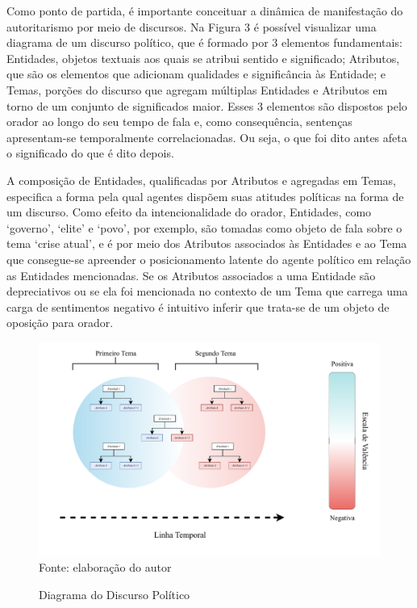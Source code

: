 \documentclass[
12pt,				%
openright,			%
twoside,			%
a4paper,			%
english,			%
french,				%
spanish,			%
brazil				%
]{abntex2}
\begin{document}
Como ponto de partida, é importante conceituar a dinâmica de manifestação do autoritarismo por meio de discursos. Na Figura 3 é possível visualizar uma diagrama de um discurso político, que é formado por 3 elementos fundamentais: Entidades, objetos textuais aos quais se atribui sentido e significado; Atributos, que são os elementos que adicionam qualidades e significância às Entidade; e Temas, porções do discurso que agregam múltiplas Entidades e Atributos em torno de um conjunto de significados maior. Esses 3 elementos são dispostos pelo orador ao longo do seu tempo de fala e, como consequência, sentenças apresentam-se temporalmente correlacionadas. Ou seja, o que foi dito antes afeta o significado do que é dito depois.

A composição de Entidades, qualificadas por Atributos e agregadas em Temas, especifica a forma pela qual agentes dispõem suas atitudes políticas na forma de um discurso. Como efeito da intencionalidade do orador, Entidades, como `governo', `elite' e `povo', por exemplo, são tomadas como objeto de fala sobre o tema `crise atual', e é por meio dos Atributos associados às Entidades e ao Tema que consegue-se apreender o posicionamento latente do agente político em relação as Entidades mencionadas. Se os Atributos associados a uma Entidade são depreciativos ou se ela foi mencionada no contexto de um Tema que carrega uma carga de sentimentos negativo é intuitivo inferir que trata-se de um objeto de oposição para orador.

\begin{figure}[h]
	\caption{Diagrama do Discurso Político}
	\label{fig:discourse_representation}
	\centering
	\includegraphics[width=1\linewidth]{figures/diagrama_discurso_autoritario}
	Fonte: elaboração do autor
\end{figure}
\end{document}
